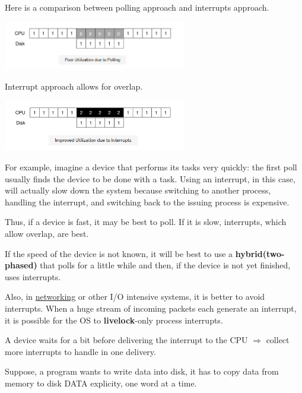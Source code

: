         Here is a comparison between polling approach and interrupts approach.

        \includegraphics[width=0.6\textwidth]{chapters/Persistence/persistence/poor_polling.png}

        Interrupt approach allows for overlap.

        \includegraphics[width=0.6\textwidth]{chapters/Persistence/persistence/improved_interrupts.png}
    

    For example, imagine a device that performs its tasks very quickly: 
    the first poll usually finds the device to be done with a task. Using an interrupt, 
    in this case, will actually slow down the system because switching to another process, 
    handling the interrupt, and switching back to the issuing process is expensive. 

    Thus, if a device is fast, it may be best to poll. 
    If it is slow, interrupts, which allow overlap, are best. 

    If the speed of the device is not known, it will be best to use a \textbf{hybrid(two-phased)} 
    that polls for a little while and then, if the device is not yet
    finished, uses interrupts.

    Also, in \underline{networking} or other I/O intensive systems, it is better to avoid 
    interrupts. When a huge stream of incoming packets each generate an interrupt, 
    it is possible for the OS to \textbf{livelock}-only process interrupts.


    A device waits for a bit before delivering the interrupt to the CPU $\Rightarrow$ collect 
    more interrupts to handle in one delivery.


        Suppose, a program wants to write data into disk, it has to copy data from memory 
        to disk DATA explicity, one word at a time. 


